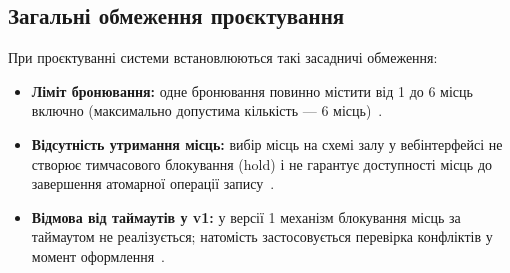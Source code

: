 \subsection{Загальні обмеження проєктування}\label{sec:opis-obmezhennia}
При проєктуванні системи встановлюються такі засадничі обмеження:
\begin{itemize}
    \item \textbf{Ліміт бронювання:} одне бронювання повинно містити від 1 до 6 місць включно (максимально допустима кількість --- 6 місць)~.
    \item \textbf{Відсутність утримання місць:} вибір місць на схемі залу у вебінтерфейсі не створює тимчасового блокування (hold) і не гарантує доступності місць до завершення атомарної операції запису~.
    \item \textbf{Відмова від таймаутів у v1:} у версії 1 механізм блокування місць за таймаутом не реалізується; натомість застосовується перевірка конфліктів у момент оформлення~.
\end{itemize}
